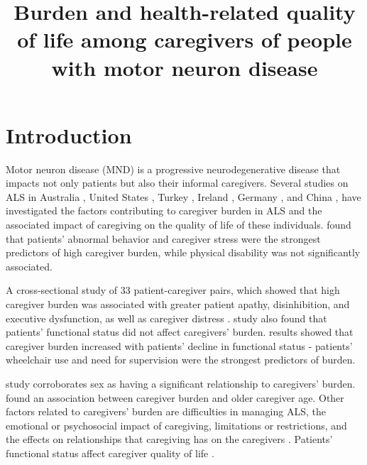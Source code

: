 \documentclass[12pt]{article}
\title{\LARGE \bfseries \vspace{-2cm} Burden and health-related quality of life among caregivers of people with motor neuron disease}
\author{\vspace{-2cm}}
\date{\vspace{-2cm}}
\begin{document}
\fontsize{13pt}{15pt}\selectfont

\maketitle


\section{Introduction}
Motor neuron disease (MND) is a progressive neurodegenerative disease that impacts not only patients but also their informal caregivers. Several studies on ALS in Australia \parencite{lillo_caregiver_2012}, United States \parencite{qutub_life_2014, burke_caregiver_2015, roach_dynamics_2009}, Turkey \parencite{tulek_care_2023}, Ireland \parencite{galvin_caregiving_2016}, Germany \parencite{schischlevskij_informal_2021}, and China \parencite{geng_patients_2017}, have investigated the factors contributing to caregiver burden in ALS and the associated impact of caregiving on the quality of life of these individuals. \textcite{lillo_caregiver_2012} found that patients' abnormal behavior and caregiver stress were the strongest predictors of high caregiver burden, while physical disability was not significantly associated. 

A cross-sectional study of 33 patient-caregiver pairs, which showed that high caregiver burden was associated with greater patient apathy, disinhibition, and executive dysfunction, as well as caregiver distress \parencite{burke_caregiver_2015}. \textcite{qutub_life_2014} study also found that patients' functional status did not affect caregivers' burden. \textcite{schischlevskij_informal_2021} results showed that caregiver burden increased with patients' decline in functional status - patients' wheelchair use and need for supervision were the strongest predictors of burden.

\textcite{tulek_care_2023} study corroborates sex as having a significant relationship to caregivers' burden. \textcite{geng_patients_2017} found an association between caregiver burden and older caregiver age. Other factors related to caregivers' burden are difficulties in managing ALS, the emotional or psychosocial impact of caregiving, limitations or restrictions, and the effects on relationships that caregiving has on the caregivers \parencite{galvin_caregiving_2016}. Patients' functional status affect caregiver quality of life \parencite{roach_dynamics_2009}.
\end{document}
